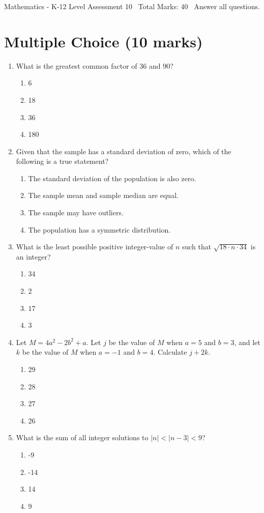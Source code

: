\documentclass[12pt]{article}
\begin{document}
\begin{center}
Mathematics - K-12 Level Assessment 10 \
Total Marks: 40 \
Answer all questions.
\end{center}

\section*{Multiple Choice (10 marks)}
\begin{enumerate}[label=\arabic*.]
\item What is the greatest common factor of 36 and 90?
\begin{enumerate}[label=(\alph*)]
    \item 6
    \item 18
    \item 36
    \item 180
\end{enumerate}
\item Given that the sample has a standard deviation of zero, which of the following is a true statement?
\begin{enumerate}[label=(\alph*)]
    \item The standard deviation of the population is also zero.
    \item The sample mean and sample median are equal.
    \item The sample may have outliers.
    \item The population has a symmetric distribution.
\end{enumerate}
\item What is the least possible positive integer-value of $n$ such that $\sqrt{18\cdot n \cdot 34}$ is an integer?
\begin{enumerate}[label=(\alph*)]
    \item 34
    \item 2
    \item 17
    \item 3
\end{enumerate}
\item Let $M=4 a^2 - 2 b^2 +a$. Let $j$ be the value of $M$ when $a=5$ and $b=3$, and let $k$ be the value of $M$ when $a=-1$ and $b=4$. Calculate $j+2 k$.
\begin{enumerate}[label=(\alph*)]
    \item 29
    \item 28
    \item 27
    \item 26
\end{enumerate}
\item What is the sum of all integer solutions to $|n| < |n-3| < 9$?
\begin{enumerate}[label=(\alph*)]
    \item -9
    \item -14
    \item 14
    \item 9
\end{enumerate}
\end{enumerate}
\end{document}
